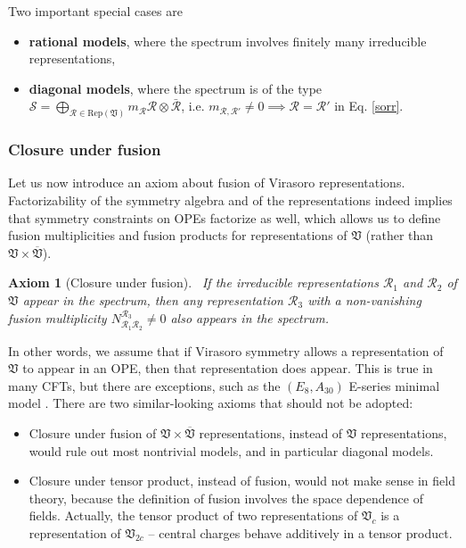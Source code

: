 \documentclass[12pt, a4paper, notitlepage, twoside]{report}
\numberwithin{equation}{section}
\theoremstyle{break}
\newtheorem{hyp}{Axiom}[chapter]
\begin{document}
Two important special cases are
\begin{itemize}
\item \textbf{\boldmath rational models}, where the spectrum involves finitely many irreducible representations,
 \item \textbf{\boldmath diagonal models}, where the spectrum is of the type $\mathcal{S}=\bigoplus_{\mathcal{R}\in \text{Rep}(\mathfrak{V})} m_\mathcal{R} \mathcal{R}\otimes \bar{\mathcal{R}}$, i.e. $m_{\mathcal{R},\mathcal{R}'}\neq 0 \implies \mathcal{R}=\mathcal{R}'$ in Eq. \eqref{sorr}.
\end{itemize}

\subsubsection{Closure under fusion}

Let us now introduce an axiom about fusion of Virasoro representations. Factorizability of the symmetry algebra and of the representations indeed implies that symmetry constraints on OPEs factorize as well, which allows us to define fusion multiplicities and fusion products for representations of $\mathfrak{V}$ (rather than $\mathfrak{V}\times \overline{\mathfrak{V}}$). 

\begin{hyp}[Closure under fusion]
~\label{ax:cuf}
If the irreducible representations $\mathcal{R}_1$ and $\mathcal{R}_2$ of $\mathfrak{V}$ appear in the spectrum, then any representation $\mathcal{R}_3$ with a non-vanishing fusion multiplicity $N_{\mathcal{R}_1\mathcal{R}_2}^{\mathcal{R}_3}\neq 0$ also appears in the spectrum. 
\end{hyp} 
\noindent
In other words, we assume that if Virasoro symmetry allows a representation of $\mathfrak{V}$ to appear in an OPE, then that representation does appear. This is true in many CFTs, but there are exceptions, such as the $(E_8,A_{30})$ E-series minimal model \cite{fms97}. 
There are two similar-looking axioms that should not be adopted:
\begin{itemize}
 \item Closure under fusion of $\mathfrak{V}\times \overline{\mathfrak{V}}$ representations, instead of $\mathfrak{V}$ representations, would rule out most nontrivial models, and in particular diagonal models. 
\item Closure under tensor product, instead of fusion, would not make sense in field theory, because the definition of fusion involves the space dependence of fields. Actually, 
the tensor product of two representations of $\mathfrak{V}_c$ is a representation of $\mathfrak{V}_{2c}$ -- central charges behave additively in a tensor product. 
\end{itemize}
\end{document}
